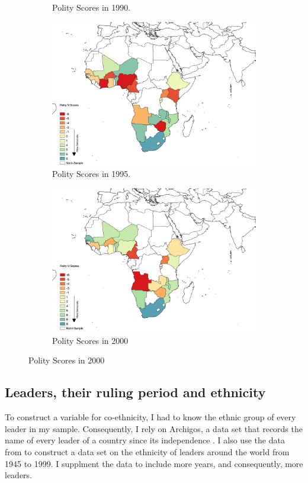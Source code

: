 \documentclass{wptemp}
\begin{document}
\begin{figure}[!htb]
\begin{subfigure}{.48\textwidth}
\caption{Polity Scores in 1990.}
\label{fig1990}
\end{subfigure}
\begin{subfigure}{.48\textwidth}
\centering
\includegraphics[width=.9\linewidth]{1995.png}
\caption{Polity Scores in 1995.}
\label{fig1995}
\end{subfigure}
\begin{subfigure}{.9\textwidth}
\centering
\includegraphics[width=.5\linewidth]{2000.png}
\caption{Polity Scores in 2000}
\label{fig2000}
\end{subfigure}


\end{figure}

\subsection{Leaders, their ruling period and ethnicity}
To construct a variable for co-ethnicity, I had to know the ethnic group of every leader in my sample. Consequently, I rely on Archigos, a data set that records the name of every leader of a country since its independence \citep{goemans2006archigos}. I also use the data from \citet{fearon2007ethnic} to construct a data set on the ethnicity of leaders around the world from 1945 to 1999. I supplment \citet{fearon2007ethnic} the data to include more years, and consequently, more leaders.
\end{document}
